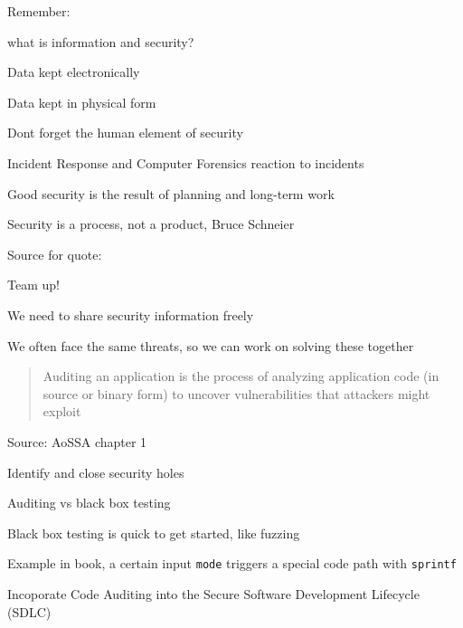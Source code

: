\documentclass[Screen16to9,17pt]{foils}
\begin{document}

\begin{list1}
\item Remember:
\begin{list2}
\item what is information and security?
\item Data kept electronically
\item Data kept in physical form
\item Dont forget the human element of security
\end{list2}
\item Incident Response and Computer Forensics reaction to incidents
\item Good security is the result of planning and long-term work
\end{list1}
\vskip 1cm
\centerline{\color{titlecolor}\LARGE Security is a process, not a product, Bruce Schneier}

Source for quote: 




\begin{list1}
\item Team up!
\item We need to share security information freely
\item We often face the same threats, so we can work on solving these together
\end{list1}



\begin{quote}
Auditing an application is the process of analyzing application code (in source or binary form) to uncover vulnerabilities that attackers might exploit
\end{quote}
Source: AoSSA chapter 1

\begin{list2}
\item Identify and close security holes
\item Auditing vs black box testing
\item Black box testing is quick to get started, like fuzzing
\item Example in book, a certain input \verb+mode+ triggers a special code path with \verb+sprintf+
\item Incoporate Code Auditing into the Secure Software Development Lifecycle (SDLC)
\end{list2}
\end{document}

